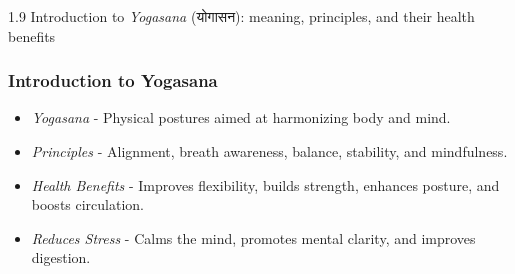 


\begin{frame}[fragile]\frametitle{}
\begin{center}
{\Large 1.9 Introduction to \textit{Yogasana} (योगासन): meaning, principles, and their health benefits}
\end{center}
\end{frame}

\begin{frame}[fragile]\frametitle{Introduction to Yogasana}

  \begin{itemize}
	\item \textit{Yogasana} - Physical postures aimed at harmonizing body and mind.
	\item \textit{Principles} - Alignment, breath awareness, balance, stability, and mindfulness.
	\item \textit{Health Benefits} - Improves flexibility, builds strength, enhances posture, and boosts circulation.
	\item \textit{Reduces Stress} - Calms the mind, promotes mental clarity, and improves digestion.
  \end{itemize}

\end{frame}



